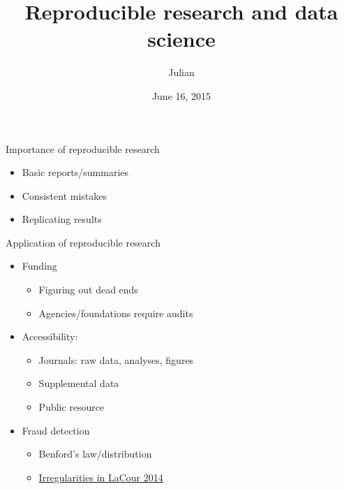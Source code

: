 \documentclass[ignorenonframetext,]{beamer}
\title{Reproducible research and data science}
\author{Julian}
\date{June 16, 2015}
\begin{document}
\frame{\titlepage}

\begin{frame}{Importance of reproducible research}

\begin{itemize}
\itemsep1pt\parskip0pt
\item
  Basic reports/summaries
\item
  Consistent mistakes
\item
  Replicating results
\end{itemize}

\end{frame}

\begin{frame}{Application of reproducible research}

\begin{itemize}
\itemsep1pt\parskip0pt
\item
  Funding

  \begin{itemize}
  \itemsep1pt\parskip0pt
  \item
    Figuring out dead ends\\
  \item
    Agencies/foundations require audits\\
  \end{itemize}
\item
  Accessibility:

  \begin{itemize}
  \itemsep1pt\parskip0pt
  \item
    Journals: raw data, analyses, figures\\
  \item
    Supplemental data\\
  \item
    Public resource\\
  \end{itemize}
\item
  Fraud detection

  \begin{itemize}
  \itemsep1pt\parskip0pt
  \item
    Benford's law/distribution\\
  \item
    \href{http://stanford.edu/~dbroock/broockman_kalla_aronow_lg_irregularities.pdf}{Irregularities
    in LaCour 2014}
  \end{itemize}
\end{itemize}

\end{frame}
\end{document}
